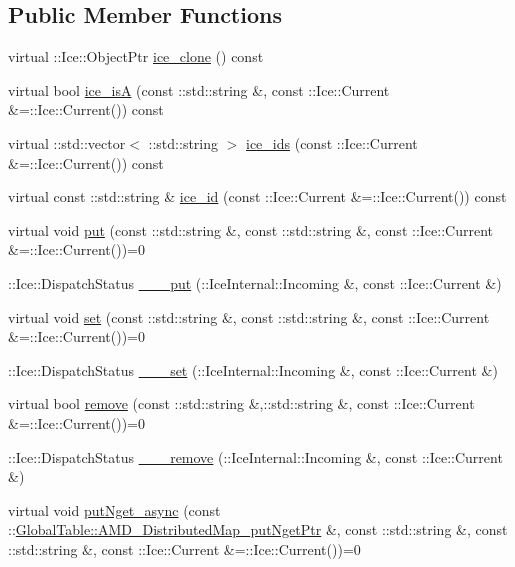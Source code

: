 \subsection*{Public Member Functions}
\begin{DoxyCompactItemize}
\item 
virtual ::Ice::ObjectPtr \hyperlink{class_global_table_1_1_distributed_map_a4a8b48c7d1b425910616cc6dc3aff56d}{ice\_\-clone} () const 
\item 
virtual bool \hyperlink{class_global_table_1_1_distributed_map_a1647e32806d42ace0aecb773bd96959f}{ice\_\-isA} (const ::std::string \&, const ::Ice::Current \&=::Ice::Current()) const 
\item 
virtual ::std::vector$<$ ::std::string $>$ \hyperlink{class_global_table_1_1_distributed_map_a3160cec3051d85a8fbaf4e97ba47f342}{ice\_\-ids} (const ::Ice::Current \&=::Ice::Current()) const 
\item 
virtual const ::std::string \& \hyperlink{class_global_table_1_1_distributed_map_ac76200d6aeeac0d53b68e04312dbd9c9}{ice\_\-id} (const ::Ice::Current \&=::Ice::Current()) const 
\item 
virtual void \hyperlink{class_global_table_1_1_distributed_map_a13884a4b83237c7f4809f162ed470404}{put} (const ::std::string \&, const ::std::string \&, const ::Ice::Current \&=::Ice::Current())=0
\item 
::Ice::DispatchStatus \hyperlink{class_global_table_1_1_distributed_map_af3512ae03f3c215d69d52f46b6341385}{\_\-\_\-\_\-put} (::IceInternal::Incoming \&, const ::Ice::Current \&)
\item 
virtual void \hyperlink{class_global_table_1_1_distributed_map_a6d83cd25ead69ddbe7c756646ee3a9c1}{set} (const ::std::string \&, const ::std::string \&, const ::Ice::Current \&=::Ice::Current())=0
\item 
::Ice::DispatchStatus \hyperlink{class_global_table_1_1_distributed_map_a936c60bcc14ff6df79444825a45262a6}{\_\-\_\-\_\-set} (::IceInternal::Incoming \&, const ::Ice::Current \&)
\item 
virtual bool \hyperlink{class_global_table_1_1_distributed_map_af961f29730e0bb80e3c8a9fd2ce0a5a7}{remove} (const ::std::string \&,::std::string \&, const ::Ice::Current \&=::Ice::Current())=0
\item 
::Ice::DispatchStatus \hyperlink{class_global_table_1_1_distributed_map_ad4122b38aa7a4fd717eb67c0bb94e209}{\_\-\_\-\_\-remove} (::IceInternal::Incoming \&, const ::Ice::Current \&)
\item 
virtual void \hyperlink{class_global_table_1_1_distributed_map_a32186a130b563bcc04707277dd3e600b}{putNget\_\-async} (const ::\hyperlink{namespace_global_table_a428cb1ad01dcd657dfcfef5d25f3ac5a}{GlobalTable::AMD\_\-DistributedMap\_\-putNgetPtr} \&, const ::std::string \&, const ::std::string \&, const ::Ice::Current \&=::Ice::Current())=0

\end{DoxyCompactItemize}
